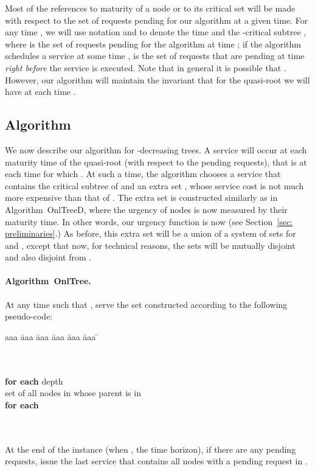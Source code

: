 \documentclass[a4paper]{article}
\newcommand{\OnAlgTreesDeadlines}{{\sc OnlTreeD}}
\newcommand{\OnAlgTreesGeneral}{{\sc OnlTree}}
\begin{document}
Most of the references to maturity of a node or to its critical set
will be made with respect to the set of requests pending for our
algorithm at a given time.  For any time , we will use notation
 and  to denote the time
 and the -critical subtree , where 
is the set of requests pending for the algorithm at time ; if the
algorithm schedules a service at some time ,  is the set of
requests that are pending at time  \emph{right before} the service
is executed. Note that in general it is possible that
. However, our algorithm will maintain the
invariant that for the quasi-root  we will have
 at each time .


\subsection{Algorithm}

We now describe our algorithm for -decreasing trees.
A service will occur at each maturity
time of the quasi-root  (with respect to the pending requests), 
that is at each time  for which .
At such a time, the algorithm chooses a service that contains the critical subtree
 of  and an extra set , whose service cost is not much more
expensive than that of . The extra set is constructed similarly as
in Algorithm~{\OnAlgTreesDeadlines}, where the urgency of nodes is now measured
by their maturity time. In other words, our urgency function
is now  (see Section~\ref{sec: preliminaries}.)
As before, this extra set will be a union of a
system of sets  for  and , except that now, for technical reasons,
the sets  will be mutually disjoint and also disjoint from .

\paragraph{Algorithm~{\OnAlgTreesGeneral}.}

At any time  such that , serve the set 
 constructed according to the following pseudo-code:
\begin{tabbing}
aaa \= aaa \= aaa \= aaa \= aaa \= aaa \= \kill
\>

\\
\> 
\\
\> \textbf{for each} depth 
\\
\> \>  set of all nodes in  whose parent is in 
\\
\> \> \textbf{for each}  
\\
\> \> \>  
\\
\> \> \> 
\\
\> \> \> 
\end{tabbing}
At the end of the instance (when , the time horizon), if there
are any pending requests, issue the last service that contains
all nodes  with a pending request in .
\end{document}
